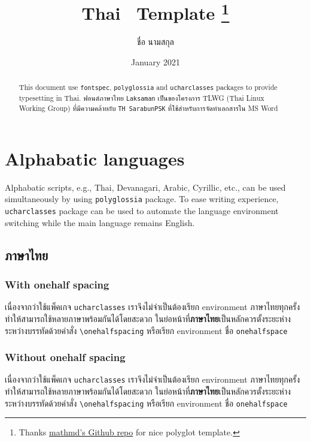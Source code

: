 \documentclass{article}
\title{Thai \XeTeX ~Template \thanks{Thanks \href{https://github.com/mathmd/polygloTeX}{mathmd's Github repo} for nice polyglot template.}}
\author{ชื่อ นามสกุล}
\date{January 2021}
\begin{document}
\sloppy %
\maketitle
\begin{abstract}
	This document use \texttt{fontspec}, \texttt{polyglossia} and \texttt{ucharclasses} packages to provide typesetting in Thai.
	ฟอนต์ภาษาไทย \textenglish{\texttt{Laksaman}} เป็นของโครงการ \textenglish{TLWG (Thai Linux Working Group)} ที่มีความคล้ายกับ \textenglish{\texttt{TH SarabunPSK}} ที่ใช้สำหรับการจัดทำเอกสารใน MS Word	
\end{abstract}

\section{Alphabatic languages}
Alphabatic scripts, e.g., Thai, Devanagari, Arabic, Cyrillic, etc., can be used simultaneously by using \texttt{polyglossia} package.
To ease writing experience, \texttt{ucharclasses} package can be used to automate the language environment switching while the main language remains English.


\subsection{ภาษาไทย}
\subsubsection{With onehalf spacing}

\begin{onehalfspace}
	เนื่องจากว่าใช้แพ็คเกจ \texttt{ucharclasses} เราจึงไม่จำเป็นต้องเรียก environment ภาษาไทยทุกครั้ง ทำให้สามารถใช้หลายภาษาพร้อมกันได้โดยสะดวก
	ในย่อหน้าที่\textbf{ภาษาไทย}เป็นหลักควรตั้งระยะห่างระหว่างบรรทัดด้วยคำสั่ง \texttt{\textbackslash onehalfspacing} หรือเรียก environment ชื่อ \texttt{onehalfspace}
\end{onehalfspace}

\subsubsection{Without onehalf spacing}
    เนื่องจากว่าใช้แพ็คเกจ \texttt{ucharclasses} เราจึงไม่จำเป็นต้องเรียก environment ภาษาไทยทุกครั้ง ทำให้สามารถใช้หลายภาษาพร้อมกันได้โดยสะดวก
    ในย่อหน้าที่\textbf{ภาษาไทย}เป็นหลักควรตั้งระยะห่างระหว่างบรรทัดด้วยคำสั่ง \texttt{\textbackslash onehalfspacing} หรือเรียก environment ชื่อ \texttt{onehalfspace}
\end{document}
